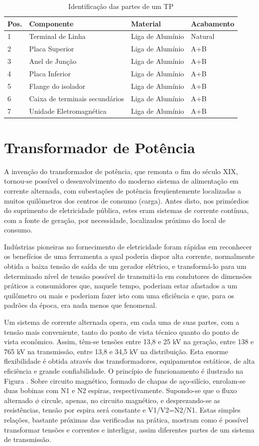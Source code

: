 \documentclass[a5paper]{ufsc-thesis}
\begin{document}
\begin{longtable}{|l|l|l|l|}
\caption{Identificação das partes de um TP}
\hline
  Pos. & Componente & Material & Acabamento \\ \hline
  1 & Terminal de Linha & Liga de Alumínio & Natural \\ \hline
  2 & Placa Superior & Liga de Alumínio & A+B \\ \hline
  3 & Anel de Junção & Liga de Alumínio & A+B \\ \hline
  4 & Placa Inferior & Liga de Alumínio & A+B \\ \hline
  5 & Flange do isolador & Liga de Alumínio & A+B \\ \hline
  6 & Caixa de terminais secundários & Liga de Alumínio & A+B \\ \hline
  7 & Unidade Eletromagnética & Liga de Alumínio & A+B \\ \hline
\end{longtable}

\section{Transformador de Potência}
A invenção do transformador de potência, que remonta o fim do século XIX, tornou-se possível o desenvolvimento do moderno sistema de alimentação em corrente alternada, com subestações de potência freqüentemente localizadas a muitos quilômetros dos centros de consumo (carga). Antes disto, nos primórdios do suprimento de eletricidade pública, estes eram sistemas de corrente contínua, com a fonte de geração, por necessidade, localizados próximo do local de consumo.\par
Indústrias pioneiras no fornecimento de eletricidade foram rápidas em reconhecer os benefícios de uma ferramenta a qual poderia dispor alta corrente, normalmente obtida a baixa tensão de saída de um gerador elétrico, e transformá-lo para um determinado nível de tensão possível de transmiti-la em condutores de dimensões práticos a consumidores que, naquele tempo, poderiam estar afastados a um quilômetro ou mais e poderiam fazer isto com uma eficiência e que, para os padrões da época, era nada menos que fenomenal.\par
Um sistema de corrente alternada opera, em cada uma de suas partes, com a tensão mais conveniente, tanto do ponto de vista técnico quanto do ponto de vista econômico. Assim, têm-se tensões entre 13,8 e 25 kV na geração, entre 138 e 765 kV na transmissão, entre 13,8 e 34,5 kV na distribuição. Esta enorme flexibilidade é obtida através dos transformadores, equipamentos estáticos, de alta eficiência e grande confiabilidade. O princípio de funcionamento é ilustrado na Figura . Sobre circuito magnético, formado de chapas de aço-silício, enrolam-se duas bobinas com N1 e N2 espiras, respectivamente. Supondo-se que o fluxo alternado $\phi$ circule, apenas, no circuito magnético, e desprezando-se as resistências, tensão por espira será constante e V1/V2=N2/N1. Estas simples relações, bastante próximas das verificadas na prática, mostram como é possível transformar tensões e correntes e interligar, assim diferentes partes de um sistema de transmissão.
\end{document}
